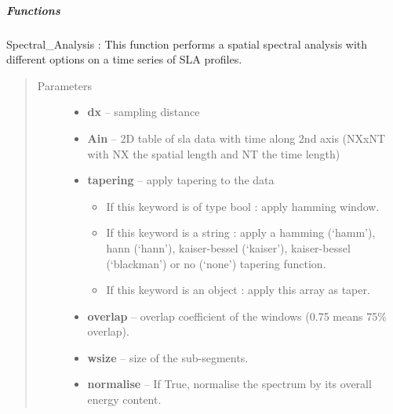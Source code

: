 \documentclass[letterpaper,10pt,english]{sphinxmanual}
\begin{document}
\subparagraph{Functions}
\label{altimetry.tools.spectrum:module-altimetry.tools.spectrum}\label{altimetry.tools.spectrum:functions}

\begin{fulllineitems}
\label{altimetry.tools.spectrum:altimetry.tools.spectrum.spectral_analysis}
Spectral\_Analysis :
This function performs a spatial spectral analysis with different options on a time series of SLA profiles.
\begin{quote}\begin{description}
\item[{Parameters}] \leavevmode\begin{itemize}
\item {} 
\textbf{dx} -- sampling distance

\item {} 
\textbf{Ain} -- 2D table of sla data with time along 2nd axis (NXxNT with NX the spatial length and NT the time length)

\item {} 
\textbf{tapering} -- 
apply tapering to the data
\begin{itemize}
\item {} 
If this keyword is of type bool : apply hamming window.

\item {} 
If this keyword is a string : apply a hamming (`hamm'), hann (`hann'), kaiser-bessel (`kaiser'), kaiser-bessel (`blackman') or no (`none') tapering function.

\item {} 
If this keyword is an  object : apply this array as taper.

\end{itemize}


\item {} 
\textbf{overlap} -- overlap coefficient of the windows (0.75 means 75\% overlap).

\item {} 
\textbf{wsize} -- size of the sub-segments.

\item {} 
\textbf{normalise} -- If True, normalise the spectrum by its overall energy content.


\end{itemize}
\end{description}
\end{quote}
\end{fulllineitems}
\end{document}

